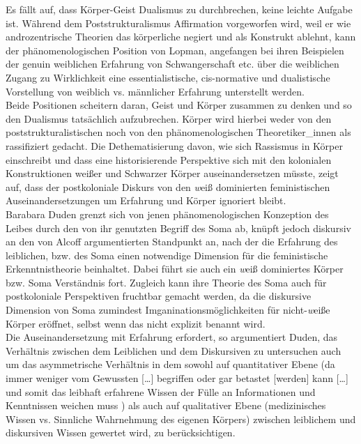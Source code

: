Es fällt auf, dass Körper-Geist Dualismus zu durchbrechen, keine leichte
Aufgabe ist. Während dem Poststrukturalismus Affirmation vorgeworfen wird, weil
er wie androzentrische Theorien das körperliche negiert und als Konstrukt
ablehnt, kann der phänomenologischen Position von Lopman, angefangen bei ihren
Beispielen der genuin weiblichen Erfahrung von Schwangerschaft etc. über die
weiblichen Zugang zu Wirklichkeit eine essentialistische, cis-normative und
dualistische Vorstellung von weiblich vs. männlicher Erfahrung unterstellt
werden. \\
Beide Positionen scheitern daran, Geist und Körper zusammen zu denken
und so den Dualismus tatsächlich aufzubrechen. Körper wird hierbei weder von
den poststrukturalistischen noch von den phänomenologischen Theoretiker\_innen
als rassifiziert gedacht. Die Dethematisierung davon, wie sich Rassismus in
Körper einschreibt und dass eine historisierende Perspektive sich mit den
kolonialen Konstruktionen weißer und Schwarzer Körper auseinandersetzen müsste,
zeigt auf, dass der postkoloniale Diskurs von den \textit{w}eiß dominierten
feministischen Auseinandersetzungen um Erfahrung und Körper ignoriert bleibt. 
\\

Barabara Duden grenzt sich von jenen phänomenologischen Konzeption des Leibes
durch den von ihr genutzten Begriff des Soma ab, knüpft jedoch diskursiv an den
von Alcoff argumentierten Standpunkt an, nach der die Erfahrung des leiblichen,
bzw. des Soma einen notwendige Dimension für die feministische
Erkenntnistheorie beinhaltet. Dabei führt sie auch ein \textit{w}eiß dominiertes Körper
bzw. Soma Verständnis fort. Zugleich kann ihre Theorie des Soma auch für
postkoloniale Perspektiven fruchtbar gemacht werden, da die diskursive
Dimension von Soma zumindest Imganinationsmöglichkeiten für nicht-\textit{w}eiße Körper
eröffnet, selbst wenn das nicht explizit benannt wird.
\\

Die Auseinandersetzung mit Erfahrung erfordert, so argumentiert Duden, das
Verhältnis zwischen dem Leiblichen und dem Diskursiven zu untersuchen auch um
das asymmetrische Verhältnis in dem sowohl auf quantitativer Ebene (\glqq da immer
weniger vom Gewussten […] begriffen oder gar betastet [werden] kann […] und
somit das leibhaft erfahrene Wissen der Fülle an Informationen und Kenntnissen
weichen muss \grqq) \footnotemark {} als auch auf qualitativer Ebene (medizinisches Wissen vs.
Sinnliche Wahrnehmung des eigenen Körpers) zwischen leiblichem und diskursiven
Wissen gewertet wird, zu berücksichtigen.

